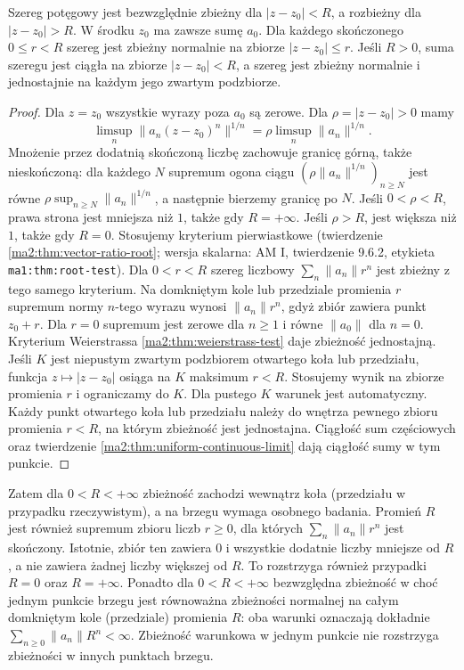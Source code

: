 \begin{twierdzenie}
\label{ma2:thm:cauchy-hadamard}
Szereg potęgowy jest bezwzględnie zbieżny
dla $|z-z_0|<R$, a rozbieżny dla $|z-z_0|>R$.
W środku $z_0$ ma zawsze sumę $a_0$.
Dla każdego skończonego $0\le r<R$ szereg
jest zbieżny normalnie na zbiorze
$|z-z_0|\le r$. Jeśli $R>0$, suma szeregu jest ciągła
na zbiorze $|z-z_0|<R$, a szereg jest
zbieżny normalnie i jednostajnie na każdym
jego zwartym podzbiorze.
\end{twierdzenie}
\begin{proof}
Dla $z=z_0$ wszystkie wyrazy poza $a_0$
są zerowe. Dla $\rho=|z-z_0|>0$ mamy
\[
 \limsup_n \|a_n(z-z_0)^n\|^{1/n}
 =\rho\limsup_n\|a_n\|^{1/n}.
\]
Mnożenie przez dodatnią skończoną liczbę
zachowuje granicę górną, także nieskończoną:
dla każdego $N$ supremum ogona ciągu
$(\rho\|a_n\|^{1/n})_{n\ge N}$ jest równe
$\rho\sup_{n\ge N}\|a_n\|^{1/n}$, a następnie
bierzemy granicę po $N$.
Jeśli $0<\rho<R$, prawa strona jest mniejsza
niż $1$, także gdy $R=+\infty$. Jeśli
$\rho>R$, jest większa niż $1$, także gdy $R=0$.
Stosujemy kryterium pierwiastkowe
(twierdzenie \ref{ma2:thm:vector-ratio-root};
wersja skalarna: AM I, twierdzenie 9.6.2,
etykieta \texttt{ma1:thm:root-test}).
Dla $0<r<R$ szereg liczbowy $\sum_n\|a_n\|r^n$
jest zbieżny z tego samego kryterium.
Na domkniętym kole lub przedziale promienia $r$
supremum normy $n$-tego wyrazu wynosi
$\|a_n\|r^n$, gdyż zbiór zawiera punkt $z_0+r$.
Dla $r=0$ supremum jest zerowe dla $n\ge1$
i równe $\|a_0\|$ dla $n=0$.
Kryterium Weierstrassa
\ref{ma2:thm:weierstrass-test} daje zbieżność
jednostajną. Jeśli $K$ jest niepustym zwartym
podzbiorem otwartego koła lub przedziału,
funkcja $z\mapsto|z-z_0|$ osiąga na $K$
maksimum $r<R$. Stosujemy wynik na zbiorze
promienia $r$ i ograniczamy do $K$.
Dla pustego $K$ warunek jest automatyczny.
Każdy punkt otwartego koła lub przedziału
należy do wnętrza pewnego zbioru promienia
$r<R$, na którym zbieżność jest jednostajna.
Ciągłość sum częściowych oraz twierdzenie
\ref{ma2:thm:uniform-continuous-limit}
dają ciągłość sumy w tym punkcie.
\end{proof}

Zatem dla $0<R<+\infty$ zbieżność zachodzi
wewnątrz koła (przedziału w przypadku rzeczywistym),
a na brzegu wymaga osobnego badania.
Promień $R$ jest również supremum zbioru
liczb $r\ge0$, dla których $\sum_n\|a_n\|r^n$
jest skończony. Istotnie, zbiór ten zawiera
$0$ i wszystkie dodatnie liczby mniejsze od $R$,
a nie zawiera żadnej liczby większej od $R$.
To rozstrzyga również przypadki $R=0$ oraz
$R=+\infty$.
Ponadto dla $0<R<+\infty$ bezwzględna
zbieżność w choć jednym punkcie brzegu
jest równoważna zbieżności normalnej na
całym domkniętym kole (przedziale) promienia
$R$: oba warunki oznaczają dokładnie
$\sum_{n\ge0}\|a_n\|R^n<\infty$.
Zbieżność warunkowa w jednym punkcie nie
rozstrzyga zbieżności w innych punktach brzegu.

